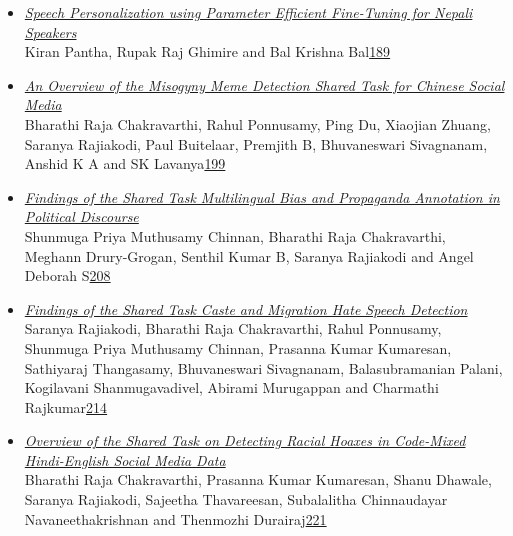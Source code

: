 \documentclass[11pt,oneside]{book}
\begin{document}
\begin{itemize}[leftmargin=*,label={}]
       \item \hyperlink{page.189}{\emph{Speech Personalization using Parameter Efficient Fine-Tuning for Nepali Speakers}}\\ \hspace*{2em} Kiran Pantha, Rupak Raj Ghimire and Bal Krishna Bal\dotfill \hyperlink{page.189}{189}
       \item \hyperlink{page.199}{\emph{An Overview of the Misogyny Meme Detection Shared Task for Chinese Social Media}}\\ \hspace*{2em} Bharathi Raja Chakravarthi, Rahul Ponnusamy, Ping Du, Xiaojian Zhuang, Saranya Rajiakodi, Paul Buitelaar, Premjith B, Bhuvaneswari Sivagnanam, Anshid K A and SK Lavanya\dotfill \hyperlink{page.199}{199}
       \item \hyperlink{page.208}{\emph{Findings of the Shared Task Multilingual Bias and Propaganda Annotation in Political Discourse}}\\ \hspace*{2em} Shunmuga Priya Muthusamy Chinnan, Bharathi Raja Chakravarthi, Meghann Drury-Grogan, Senthil Kumar B, Saranya Rajiakodi and Angel Deborah S\dotfill \hyperlink{page.208}{208}
       \item \hyperlink{page.214}{\emph{Findings of the Shared Task Caste and Migration Hate Speech Detection}}\\ \hspace*{2em} Saranya Rajiakodi, Bharathi Raja Chakravarthi, Rahul Ponnusamy, Shunmuga Priya Muthusamy Chinnan, Prasanna Kumar Kumaresan, Sathiyaraj Thangasamy, Bhuvaneswari Sivagnanam, Balasubramanian Palani, Kogilavani Shanmugavadivel, Abirami Murugappan and Charmathi Rajkumar\dotfill \hyperlink{page.214}{214}
       \item \hyperlink{page.221}{\emph{Overview of the Shared Task on Detecting Racial Hoaxes in Code-Mixed Hindi-English Social Media Data}}\\ \hspace*{2em} Bharathi Raja Chakravarthi, Prasanna Kumar Kumaresan, Shanu Dhawale, Saranya Rajiakodi, Sajeetha Thavareesan, Subalalitha Chinnaudayar Navaneethakrishnan and Thenmozhi Durairaj\dotfill \hyperlink{page.221}{221}

\end{itemize}
\end{document}
